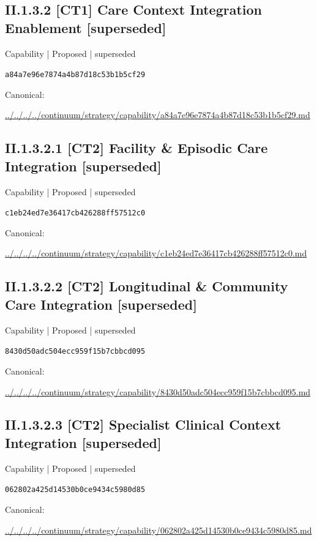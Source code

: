 \documentclass[10pt,a4paper]{article}
\begin{document}
\subsection*{II.1.3.2 [CT1] Care Context Integration Enablement [superseded]}
\label{element-a84a7e96e7874a4b87d18c53b1b5cf29}
{\small Capability | Proposed | superseded}\par
\texttt{a84a7e96e7874a4b87d18c53b1b5cf29}\par
Canonical: \par
{\footnotesize\url{../../../../continuum/strategy/capability/a84a7e96e7874a4b87d18c53b1b5cf29.md}}\par
\subsection*{II.1.3.2.1 [CT2] Facility \& Episodic Care Integration [superseded]}
\label{element-c1eb24ed7e36417cb426288ff57512c0}
{\small Capability | Proposed | superseded}\par
\texttt{c1eb24ed7e36417cb426288ff57512c0}\par
Canonical: \par
{\footnotesize\url{../../../../continuum/strategy/capability/c1eb24ed7e36417cb426288ff57512c0.md}}\par
\subsection*{II.1.3.2.2 [CT2] Longitudinal \& Community Care Integration [superseded]}
\label{element-8430d50adc504ecc959f15b7cbbcd095}
{\small Capability | Proposed | superseded}\par
\texttt{8430d50adc504ecc959f15b7cbbcd095}\par
Canonical: \par
{\footnotesize\url{../../../../continuum/strategy/capability/8430d50adc504ecc959f15b7cbbcd095.md}}\par
\subsection*{II.1.3.2.3 [CT2] Specialist Clinical Context Integration [superseded]}
\label{element-062802a425d14530b0ce9434c5980d85}
{\small Capability | Proposed | superseded}\par
\texttt{062802a425d14530b0ce9434c5980d85}\par
Canonical: \par
{\footnotesize\url{../../../../continuum/strategy/capability/062802a425d14530b0ce9434c5980d85.md}}\par
\end{document}
